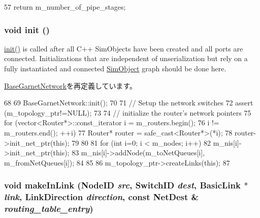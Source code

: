 \begin{DoxyCode}
57 {return m_number_of_pipe_stages; }
\end{DoxyCode}
\hypertarget{classGarnetNetwork_a02fd73d861ef2e4aabb38c0c9ff82947}{
\subsubsection[{init}]{\setlength{\rightskip}{0pt plus 5cm}void init ()}}
\label{classGarnetNetwork_a02fd73d861ef2e4aabb38c0c9ff82947}
\hyperlink{classGarnetNetwork_a02fd73d861ef2e4aabb38c0c9ff82947}{init()} is called after all C++ SimObjects have been created and all ports are connected. Initializations that are independent of unserialization but rely on a fully instantiated and connected \hyperlink{classSimObject}{SimObject} graph should be done here. 

\hyperlink{classBaseGarnetNetwork_a02fd73d861ef2e4aabb38c0c9ff82947}{BaseGarnetNetwork}を再定義しています。


\begin{DoxyCode}
68 {
69     BaseGarnetNetwork::init();
70 
71     // Setup the network switches
72     assert (m_topology_ptr!=NULL);
73 
74     // initialize the router's network pointers
75     for (vector<Router*>::const_iterator i = m_routers.begin();
76          i != m_routers.end(); ++i) {
77         Router* router = safe_cast<Router*>(*i);
78         router->init_net_ptr(this);
79     }
80 
81     for (int i=0; i < m_nodes; i++) {
82         m_nis[i]->init_net_ptr(this);
83         m_nis[i]->addNode(m_toNetQueues[i], m_fromNetQueues[i]);
84     }
85 
86     m_topology_ptr->createLinks(this);
87 }
\end{DoxyCode}
\hypertarget{classGarnetNetwork_ac4cf8ff50e877f26606c24880c73fb9d}{
\subsubsection[{makeInLink}]{\setlength{\rightskip}{0pt plus 5cm}void makeInLink ({\bf NodeID} {\em src}, \/  {\bf SwitchID} {\em dest}, \/  {\bf BasicLink} $\ast$ {\em link}, \/  LinkDirection {\em direction}, \/  const {\bf NetDest} \& {\em routing\_\-table\_\-entry})}}
\label{classGarnetNetwork_ac4cf8ff50e877f26606c24880c73fb9d}


